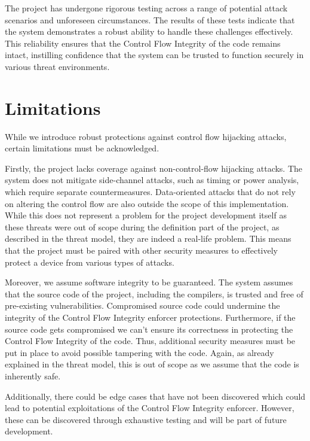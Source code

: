 The project has undergone rigorous testing across a range of potential attack
scenarios and unforeseen circumstances. The results of these tests indicate that
the system demonstrates a robust ability to handle these challenges effectively.
This reliability ensures that the Control Flow Integrity of the code remains
intact, instilling confidence that the system can be trusted to function securely
in various threat environments.

\section{Limitations}
\label{sec:ta_limitations}

While we introduce robust protections against control flow hijacking attacks, certain
limitations must be acknowledged.

Firstly, the project lacks coverage against non-control-flow hijacking attacks. The
system does not mitigate side-channel attacks, such as timing or power analysis,
which require separate countermeasures. Data-oriented attacks that do not rely
on altering the control flow are also outside the scope of this implementation. While
this does not represent a problem for the project development itself as these threats
were out of scope during the definition part of the project, as described in the
threat model, they are indeed a real-life problem. This means that the project
must be paired with other security measures to effectively protect a device from
various types of attacks.

Moreover, we assume software integrity to be guaranteed. The system assumes that
the source code of the project, including the compilers, is trusted and free of
pre-existing vulnerabilities. Compromised source code could undermine the integrity
of the Control Flow Integrity enforcer protections. Furthermore, if the source code
gets compromised we can't ensure its correctness in protecting the Control Flow Integrity
of the code. Thus, additional security measures must be put in place to avoid possible
tampering with the code. Again, as already explained in the threat model, this
is out of scope as we assume that the code is inherently safe.

Additionally, there could be edge cases that have not been discovered which could
lead to potential exploitations of the Control Flow Integrity enforcer. However,
these can be discovered through exhaustive testing and will be part of future development.

